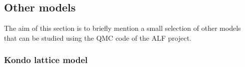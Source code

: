 
\subsection{Other models}
\label{sec:other_models}

The aim of this section is to briefly mention  a small  selection of  other models that can be studied using the QMC code of the ALF project.  
  
\subsubsection{Kondo lattice model}


